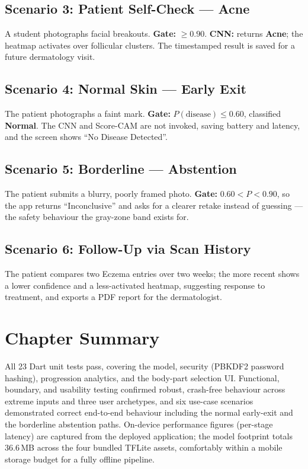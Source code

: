 \subsection{Scenario 3: Patient Self-Check — Acne}
A student photographs facial breakouts. \textbf{Gate:} $\ge0.90$. \textbf{CNN:}
returns \textbf{Acne}; the heatmap activates over follicular clusters. The
timestamped result is saved for a future dermatology visit.

\subsection{Scenario 4: Normal Skin — Early Exit}
The patient photographs a faint mark. \textbf{Gate:} $P(\text{disease}) \le 0.60$,
classified \textbf{Normal}. The CNN and Score-CAM are not invoked, saving battery
and latency, and the screen shows ``No Disease Detected''.

\subsection{Scenario 5: Borderline — Abstention}
The patient submits a blurry, poorly framed photo. \textbf{Gate:}
$0.60 < P < 0.90$, so the app returns ``Inconclusive'' and asks for a clearer
retake instead of guessing — the safety behaviour the gray-zone band exists for.

\subsection{Scenario 6: Follow-Up via Scan History}
The patient compares two Eczema entries over two weeks; the more recent shows a
lower confidence and a less-activated heatmap, suggesting response to treatment,
and exports a PDF report for the dermatologist.

\section{Chapter Summary}

All 23 Dart unit tests pass, covering the model, security (PBKDF2 password
hashing), progression analytics, and the body-part selection UI. Functional,
boundary, and usability testing confirmed robust, crash-free behaviour across
extreme inputs and three user archetypes, and six use-case scenarios demonstrated
correct end-to-end behaviour including the normal early-exit and the borderline
abstention paths. On-device performance figures (per-stage latency) are captured
from the deployed application; the model footprint totals 36.6\,MB across the
four bundled TFLite assets, comfortably within a mobile storage budget for a
fully offline pipeline.
